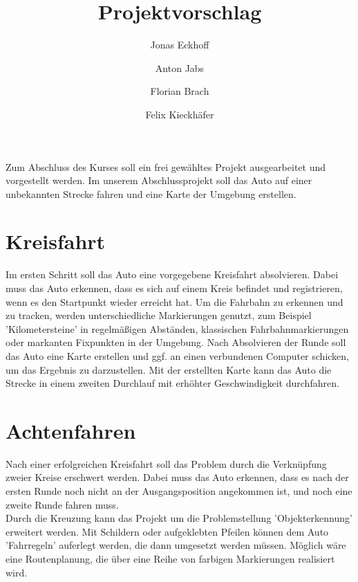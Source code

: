\documentclass[DIV=15, notitlepage,10pt]{article}
\begin{document}
\title{Projektvorschlag}

\author{
  Jonas Eckhoff
  \and
  Anton Jabs
  \and
  Florian Brach
  \and
  Felix Kieckhäfer
}





\maketitle
Zum Abschluss des Kurses soll ein frei gewähltes Projekt ausgearbeitet und vorgestellt werden. 
Im unserem Abschlussprojekt soll das Auto auf einer unbekannten Strecke fahren und eine Karte der Umgebung erstellen. 
\section{Kreisfahrt}
Im ersten Schritt soll das Auto eine vorgegebene Kreisfahrt absolvieren. Dabei muss das Auto erkennen, dass es sich auf einem Kreis befindet und registrieren, wenn es den Startpunkt wieder erreicht hat. 
Um die Fahrbahn zu erkennen und zu tracken, werden unterschiedliche Markierungen genutzt, zum Beispiel 'Kilometersteine' in regelmäßigen Abständen, klassischen Fahrbahnmarkierungen oder markanten Fixpunkten in der Umgebung. 
Nach Absolvieren der Runde soll das Auto eine Karte erstellen und ggf. an einen verbundenen Computer schicken, um das Ergebnis zu darzustellen. 
Mit der erstellten Karte kann das Auto die Strecke in einem zweiten Durchlauf mit erhöhter Geschwindigkeit durchfahren. 
  
\section{Achtenfahren}
Nach einer erfolgreichen Kreisfahrt soll das Problem durch die Verknüpfung zweier Kreise erschwert werden. Dabei muss das Auto erkennen, dass es nach der ersten Runde noch nicht an der Ausgangsposition angekommen ist, und noch eine zweite Runde fahren muss. \\
Durch die Kreuzung kann das Projekt um die Problemstellung 'Objekterkennung' erweitert werden. Mit Schildern oder aufgeklebten Pfeilen können dem Auto 'Fahrregeln' auferlegt werden, die dann umgesetzt werden müssen. Möglich wäre eine Routenplanung, die über eine Reihe von farbigen Markierungen realisiert wird. 
\end{document}
